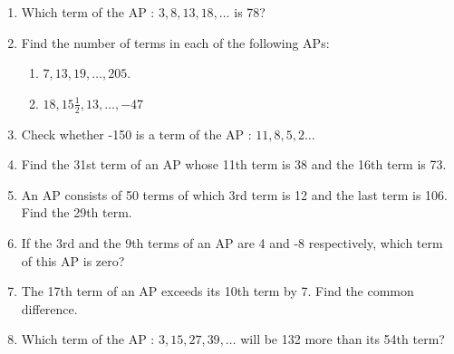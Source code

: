 \begin{enumerate}[label=\thesubsection.\arabic*, ref=\thesubsection.\theenumi]
\begin{enumerate}
\begin{multicols}{4}
\end{multicols}
\item $11^{th}$ term of the AP: $ -3,  -\frac{1}{2},  2, \dots  $ is 
	\begin{multicols}{4}
\begin{enumerate}
\item 28
\item 22
\item -38
\item $-48\frac{1}{2}$
\end{enumerate}
\end{multicols}
\item In the following APs,  find the missing terms in the blanks  
	\begin{multicols}{2}
\begin{enumerate}
\item $2,  \dots,  26$
\item $\dots  ,  13, \dots  ,  3$
\item $5,  \dots  ,  \dots  ,  9\frac{1}{2}$
\item $-4,  \dots  ,  \dots  ,  \dots  ,  \dots,  6$
\item $\dots ,  38,  \dots ,  \dots ,  \dots ,  -22$
\end{enumerate}
\end{multicols}
\end{enumerate}
\item Which term of the AP : $3,  8,  13,  18,  \dots $ is 78?
\item Find the number of terms in each of the following APs:
\begin{enumerate}
	\item $7,  13,  19,  \dots , 205$.
	\item $18,  15\frac{1}{2},  13, \dots , -47$
\end{enumerate}
\item Check whether -150 is a term of the AP : $11,  8,  5,  2 \dots $ 
\item Find the 31st term of an AP whose 11th term is 38 and the 16th term is 73.
\item An AP consists of 50 terms of which 3rd term is 12 and the last term is 106. Find the 29th term.
\item If the 3rd and the 9th terms of an AP are 4 and -8 respectively,  which term of this AP is zero?
\item The 17th term of an AP exceeds its 10th term by 7. Find the common difference.
\item Which term of the AP : $3,  15,  27,  39, \dots $  will be 132 more than its 54th term? 

\end{enumerate}
